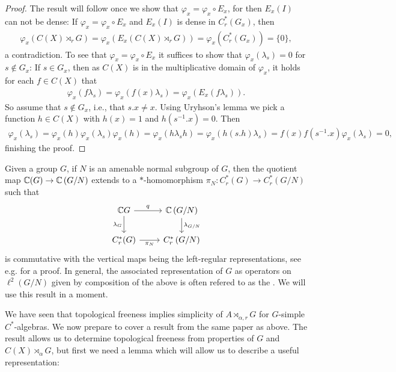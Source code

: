 \begin{proof}
	The result will follow once we show that $\varphi_x = \varphi_x \circ E_x$, for then $E_x(I)$ can not be dense: If $\varphi_x = \varphi_x \circ E_x$ and $E_x(I)$ is dense in $C_r^*(G_x)$, then 
	\begin{align*}
		\varphi_x(C(X) \rtimes_r G) = \varphi_x (E_x(C(X) \rtimes_r G)) = \varphi_x(C^*_r(G_x))=\{0\},
	\end{align*}
a contradiction. To see that $\varphi_x = \varphi_x \circ E_x$ it suffices to show that $\varphi_x (\lambda_s) = 0$ for $s \not \in G_x$: If $s \in G_x$, then as $C(X)$ is in the multiplicative domain of $\varphi_x$, it holds for each $f \in C(X)$ that
	\begin{align*}
		\varphi_x(f \lambda_s) =  \varphi_x( f(x) \lambda_s)  =  \varphi_x (E_x( f\lambda_s)).
	\end{align*}
	So assume that $s \not \in G_x$, i.e., that $s.x \neq x$. Using Uryhson's lemma we pick a function $h \in C(X)$ with $h(x) = 1$ and $h(s^{-1}.x) = 0$. Then
	\begin{align*}
		\varphi_x(\lambda_s) =\varphi_x(h)\varphi_x(\lambda_s) \varphi_x(h)= \varphi_x(h\lambda_sh) = \varphi_x(h (s.h)\lambda_s)=f(x)f(s^{-1}.x) \varphi_x(\lambda_s) = 0,
	\end{align*}
	finishing the proof.
\end{proof}
\begin{remark}
	Given a group $G$, if $N$ is an amenable normal subgroup of $G$, then the quotient map $\mathbb{C}( G) \to \mathbb{C} \left(G/N\right)$ extends to a $*$-homomorphism $\pi_N \colon C_r^*(G) \to C_r^*\left( G/N \right)$ such that
\begin{equation}
	\begin{tikzcd}
		\C G \ar[r,"q"] \ar[d,"\lambda_G"'] & \C\left( G/N \right) \ar[d, "\lambda_{G/N}"]\\
		C_r^*(G) \ar[r,"\pi_N"'] & C_r^*\left( G/N \right)
	\end{tikzcd}
\end{equation}
is commutative with the vertical maps being the left-regular representations, see e.g. \cite[Proposition 3]{de2007simplicity} for a proof. In general, the associated representation of $G$ as operators on $\ell^2(G/N)$ given by composition of the above is often refered to as the . We will use this result in a moment.
\label{quotientextend}
\end{remark}
We have seen that topological freeness implies simplicity of $A \rtimes_{\alpha,r} G$ for $G$-simple $C^*$-algebras. We now prepare to cover a result from the same paper as above. The result allows us to determine topological freeness from properties of $G$ and $C(X)\rtimes_\alpha G$, but first we need a lemma which will allow us to describe a useful representation:
